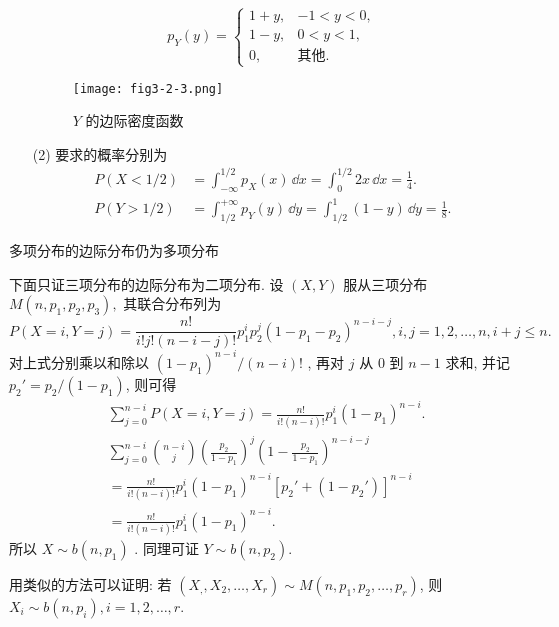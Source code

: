 \begin{solution}
\begin{itemize}
\begin{equation*}
  		p_{Y}(y)=
  		\begin{cases}
  		1+y, & -1<y<0,\\
  		1-y, & 0<y<1,\\
  		0, & \text{其他}.
  		\end{cases}
  		\end{equation*}
  		\begin{figure}[h]
  			\centering
  			\texttt{[image: fig3-2-3.png]}
  			\caption{ $Y$ 的边际密度函数}\label{fig:3.2.3}
  		\end{figure}
  		\item[(2)] 要求的概率分别为
  		\begin{align*}
  		P(X<1/2) &= \int_{-\infty}^{1/2}p_{X}(x)\,\dd x=\int_{0}^{1/2}2x\,\dd x=\frac{1}{4}.\\
  		P(Y>1/2) &= \int_{1/2}^{+\infty}p_{Y}(y)\,\dd y=\int_{1/2}^{1}(1-y)\,\dd y=\frac{1}{8}.
  		\end{align*}
  	\end{itemize}
  \end{solution}
  
  \begin{example}\label{exam:3.2.4}
  	多项分布的边际分布仍为多项分布
  \end{example}
  \begin{solution}
  	下面只证三项分布的边际分布为二项分布. 设 $(X,Y)$ 服从三项分布 $M(n,p_1,p_2,p_3),$  其联合分布列为
  	\begin{equation*}
  	P(X=i,Y=j)=\frac{n!}{i!j!(n-i-j)!}p_1^ip_2^j(1-p_1-p_2)^{n-i-j}, i,j=1,2,\ldots,n,i+j\leqslant n.
  	\end{equation*}
  	对上式分别乘以和除以 $(1-p_1)^{n-i}/(n-i)!$ , 再对 $j$ 从 $0$ 到 $n-1$ 求和, 并记 $p_2'=p_2/(1-p_1)$, 则可得
  	\begin{align*}
  	&\sum_{j=0}^{n-i}P(X=i,Y=j) = \frac{n!}{i!(n-i)!}p_1^i(1-p_1)^{n-i}.\\
  	&\sum_{j=0}^{n-i} \binom{n-i}{j} \left(\frac{p_2}{1-p_1}\right)^{j}\left(1-\frac{p_2}{1-p_1}\right)^{n-i-j} \\
  	&= \frac{n!}{i!(n-i)!}p_1^i(1-p_1)^{n-i}\left[p_2'+(1-p_2')\right]^{n-i}\\
  	&= \frac{n!}{i!(n-i)!}p_1^i(1-p_1)^{n-i}.
  	\end{align*}
  	所以 $X\sim b(n,p_1)$ . 同理可证 $Y\sim b(n,p_2)$.
  	
  	用类似的方法可以证明: 若 $(X_,,X_2,\ldots,X_r)\sim M(n,p_1,p_2,\ldots,p_r)$, 则 $X_i\sim b(n,p_i), i=1,2,\ldots,r$.
  \end{solution}
  
